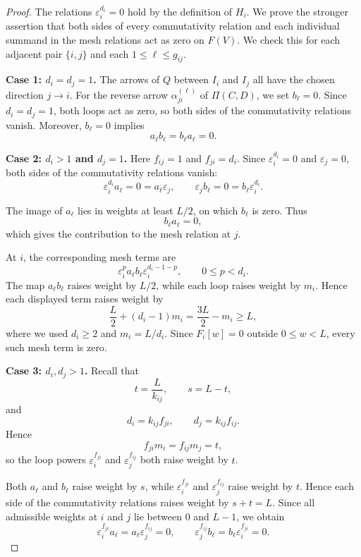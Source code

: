 \documentclass[12pt,reqno]{amsart}
\numberwithin{equation}{section}
\theoremstyle{definition}
\theoremstyle{remark}
\theoremstyle{plain}
\theoremstyle{plain}
\begin{document}
\begin{proof}
The relations $\varepsilon_i^{d_i}=0$ hold by the definition of $H_i$.
We prove the stronger assertion that both sides of every commutativity relation and each individual summand in the mesh relations act as zero on $F(V)$. We check this for each adjacent pair $\{i,j\}$ and each $1\le\ell\le g_{ij}$.
\par\smallskip
\noindent\textbf{Case 1: $d_i=d_j=1$.}
The arrows of $Q$ between $I_i$ and $I_j$ all have the chosen direction $j\to i$. For the reverse arrow $\alpha_{ji}^{(\ell)}$ of $\Pi(C,D)$, we set $b_\ell=0$.
Since $d_i=d_j=1$, both loops act as zero, so both sides of the commutativity relations vanish. Moreover, $b_\ell=0$ implies
\[
    a_\ell b_\ell=b_\ell a_\ell=0.
\]

\par\smallskip
\noindent\textbf{Case 2: $d_i>1$ and $d_j=1$.}
Here $f_{ij}=1$ and $f_{ji}=d_i$.
Since $\varepsilon_i^{d_i}=0$ and $\varepsilon_j=0$, both sides of the commutativity relations vanish:
\[
    \varepsilon_i^{d_i}a_\ell
    =0=a_\ell\varepsilon_j,
    \qquad
    \varepsilon_jb_\ell
    =0=b_\ell\varepsilon_i^{d_i}.
\]

The image of $a_\ell$ lies in weights
at least $L/2$, on which $b_\ell$ is zero.
Thus
\[
b_\ell a_\ell=0,
\]
which gives the contribution to the mesh relation at $j$.

At $i$, the corresponding mesh terms are
\[
\varepsilon_i^p a_\ell b_\ell
\varepsilon_i^{d_i-1-p},
\qquad 0\leq p<d_i.
\]
The map $a_\ell b_\ell$ raises weight by
$L/2$, while each loop raises weight by
$m_i$. Hence each displayed term raises
weight by
\[
\frac L2+(d_i-1)m_i
=
\frac{3L}{2}-m_i
\geq L,
\]
where we used $d_i\geq2$ and $m_i=L/d_i$. Since $F_i[w]=0$ outside $0\le w<L$, every such mesh term is zero.

\par\smallskip
\noindent\textbf{Case 3: $d_i,d_j>1$.}
Recall that
\[
    t=\frac{L}{k_{ij}},
    \qquad
    s=L-t,
\]
and
\[
    d_i=k_{ij}f_{ji},
    \qquad
    d_j=k_{ij}f_{ij}.
\]
Hence
\[
    f_{ji}m_i=f_{ij}m_j=t,
\]
so the loop powers $\varepsilon_i^{f_{ji}}$ and $\varepsilon_j^{f_{ij}}$ both raise weight by $t$.

Both $a_\ell$ and $b_\ell$ raise weight by $s$, while $\varepsilon_i^{f_{ji}}$ and $\varepsilon_j^{f_{ij}}$ raise weight by $t$. Hence each side of the commutativity relations raises weight by $s+t=L$. Since all admissible weights at $i$ and $j$ lie between $0$ and $L-1$, we obtain
\[
    \varepsilon_i^{f_{ji}}a_\ell
    =a_\ell\varepsilon_j^{f_{ij}}=0,
    \qquad
    \varepsilon_j^{f_{ij}}b_\ell
    =b_\ell\varepsilon_i^{f_{ji}}=0.
\]


\end{proof}
\end{document}
